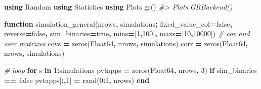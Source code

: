 \documentclass[
]{article}
\newenvironment{Shaded}{\begin{snugshade}}{\end{snugshade}}
\newcommand{\BuiltInTok}[1]{#1}
\newcommand{\CommentTok}[1]{\textcolor[rgb]{0.56,0.35,0.01}{\textit{#1}}}
\newcommand{\DataTypeTok}[1]{\textcolor[rgb]{0.13,0.29,0.53}{#1}}
\newcommand{\ExtensionTok}[1]{#1}
\newcommand{\FloatTok}[1]{\textcolor[rgb]{0.00,0.00,0.81}{#1}}
\newcommand{\KeywordTok}[1]{\textcolor[rgb]{0.13,0.29,0.53}{\textbf{#1}}}
\newcommand{\NormalTok}[1]{#1}
\newcommand{\OperatorTok}[1]{\textcolor[rgb]{0.81,0.36,0.00}{\textbf{#1}}}
\begin{document}
\begin{Shaded}
\begin{Highlighting}[]
\KeywordTok{using} \BuiltInTok{Random}
\KeywordTok{using}\NormalTok{ Statistics}
\KeywordTok{using}\NormalTok{ Plots}
\NormalTok{gr()}
\CommentTok{\#\textgreater{} Plots.GRBackend()}

\KeywordTok{function}\NormalTok{ simulation\_general(nrows}\OperatorTok{,}\NormalTok{ simulations}\OperatorTok{;}\NormalTok{ fixed\_value\_col}\OperatorTok{=}\ExtensionTok{false}\OperatorTok{,}\NormalTok{ reverse}\OperatorTok{=}\ExtensionTok{false}\OperatorTok{,}\NormalTok{ sim\_binaries}\OperatorTok{=}\ExtensionTok{true}\OperatorTok{,}\NormalTok{ mins}\OperatorTok{=}\NormalTok{[}\FloatTok{1}\OperatorTok{,}\FloatTok{100}\NormalTok{]}\OperatorTok{,}\NormalTok{ maxs}\OperatorTok{=}\NormalTok{[}\FloatTok{10}\OperatorTok{,}\FloatTok{10000}\NormalTok{]) }
    \CommentTok{\# cov and corr matrixes}
\NormalTok{    covs }\OperatorTok{=}\NormalTok{ zeros(}\DataTypeTok{Float64}\OperatorTok{,}\NormalTok{ nrows}\OperatorTok{,}\NormalTok{ simulations)}
\NormalTok{    corr }\OperatorTok{=}\NormalTok{ zeros(}\DataTypeTok{Float64}\OperatorTok{,}\NormalTok{ nrows}\OperatorTok{,}\NormalTok{ simulations)}

    \CommentTok{\# loop}
    \KeywordTok{for}\NormalTok{ s }\KeywordTok{in} \FloatTok{1}\OperatorTok{:}\NormalTok{simulations}
\NormalTok{        pvtapps }\OperatorTok{=}\NormalTok{ zeros(}\DataTypeTok{Float64}\OperatorTok{,}\NormalTok{ nrows}\OperatorTok{,} \FloatTok{3}\NormalTok{)}
        \KeywordTok{if}\NormalTok{ sim\_binaries }\OperatorTok{==} \ExtensionTok{false}
\NormalTok{            pvtapps[}\OperatorTok{:,}\FloatTok{1}\NormalTok{] }\OperatorTok{=}\NormalTok{ rand(}\FloatTok{0}\OperatorTok{:}\FloatTok{1}\OperatorTok{,}\NormalTok{ nrows)}
        \KeywordTok{end}


\end{Highlighting}
\end{Shaded}
\end{document}
